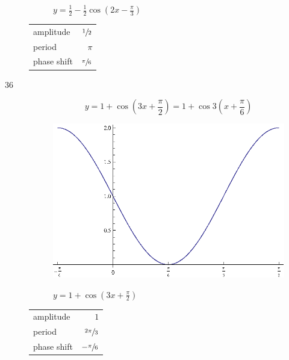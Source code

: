\documentclass{exam}
\begin{document}
\begin{description}
\begin{figure}[H]
          $y = \frac{1}{2} - \frac{1}{2} \cos \left( 2x - \frac{\pi}{3} \right)$
        \end{figure}

        \begin{tabular}[H]{lr}
          \toprule
          amplitude   & $\sfrac{1}{2}$ \\
          period      & $\pi$ \\
          phase shift & $\sfrac{\pi}{6}$ \\
          \bottomrule
        \end{tabular}

      \pagebreak

      \item[36]
        \[
          y = 1 + \cos \left( 3x + \frac{\pi}{2} \right) = 1 + \cos 3 \left( x + \frac{\pi}{6} \right)
        \]

        \begin{figure}[H]
          \centering
          \includegraphics[scale=1.0]{exercise36.eps}

          $y = 1 + \cos \left( 3x + \frac{\pi}{2} \right)$
        \end{figure}

        \begin{tabular}[H]{lr}
          \toprule
          amplitude   & $1$ \\
          period      & $\sfrac{2 \pi}{3}$ \\
          phase shift & $- \sfrac{\pi}{6}$ \\
          \bottomrule
        \end{tabular}

      \pagebreak


\end{description}
\end{document}

